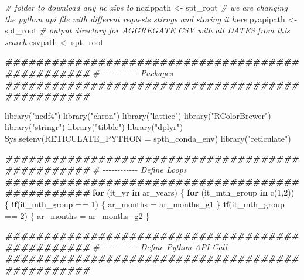 \documentclass[
]{book}
\newenvironment{Shaded}{\begin{snugshade}}{\end{snugshade}}
\newcommand{\AttributeTok}[1]{\textcolor[rgb]{0.77,0.63,0.00}{#1}}
\newcommand{\CommentTok}[1]{\textcolor[rgb]{0.56,0.35,0.01}{\textit{#1}}}
\newcommand{\ControlFlowTok}[1]{\textcolor[rgb]{0.13,0.29,0.53}{\textbf{#1}}}
\newcommand{\DecValTok}[1]{\textcolor[rgb]{0.00,0.00,0.81}{#1}}
\newcommand{\DocumentationTok}[1]{\textcolor[rgb]{0.56,0.35,0.01}{\textbf{\textit{#1}}}}
\newcommand{\FunctionTok}[1]{\textcolor[rgb]{0.00,0.00,0.00}{#1}}
\newcommand{\NormalTok}[1]{#1}
\newcommand{\OtherTok}[1]{\textcolor[rgb]{0.56,0.35,0.01}{#1}}
\newcommand{\SpecialCharTok}[1]{\textcolor[rgb]{0.00,0.00,0.00}{#1}}
\newcommand{\StringTok}[1]{\textcolor[rgb]{0.31,0.60,0.02}{#1}}
\begin{document}
\begin{Shaded}
\begin{Highlighting}[]
\CommentTok{\# folder to download any nc zips to}
\NormalTok{nczippath }\OtherTok{\textless{}{-}}\NormalTok{ spt\_root}
\CommentTok{\# we are changing the python api file with different requests stirngs and storing it here}
\NormalTok{pyapipath }\OtherTok{\textless{}{-}}\NormalTok{ spt\_root}
\CommentTok{\# output directory for AGGREGATE CSV with all DATES from this search}
\NormalTok{csvpath }\OtherTok{\textless{}{-}}\NormalTok{ spt\_root}

\DocumentationTok{\#\#\#\#\#\#\#\#\#\#\#\#\#\#\#\#\#\#\#\#\#\#\#\#\#\#\#\#\#\#\#\#\#\#\#\#\#\#\#\#\#\#\#\#\#\#\#\#\#}
\CommentTok{\# {-}{-}{-}{-}{-}{-}{-}{-}{-}{-}{-}{-} Packages}
\DocumentationTok{\#\#\#\#\#\#\#\#\#\#\#\#\#\#\#\#\#\#\#\#\#\#\#\#\#\#\#\#\#\#\#\#\#\#\#\#\#\#\#\#\#\#\#\#\#\#\#\#\#}

\FunctionTok{library}\NormalTok{(}\StringTok{"ncdf4"}\NormalTok{)}
\FunctionTok{library}\NormalTok{(}\StringTok{"chron"}\NormalTok{)}
\FunctionTok{library}\NormalTok{(}\StringTok{"lattice"}\NormalTok{)}
\FunctionTok{library}\NormalTok{(}\StringTok{"RColorBrewer"}\NormalTok{)}
\FunctionTok{library}\NormalTok{(}\StringTok{"stringr"}\NormalTok{)}
\FunctionTok{library}\NormalTok{(}\StringTok{"tibble"}\NormalTok{)}
\FunctionTok{library}\NormalTok{(}\StringTok{"dplyr"}\NormalTok{)}
\FunctionTok{Sys.setenv}\NormalTok{(}\AttributeTok{RETICULATE\_PYTHON =}\NormalTok{ spth\_conda\_env)}
\FunctionTok{library}\NormalTok{(}\StringTok{"reticulate"}\NormalTok{)}

\DocumentationTok{\#\#\#\#\#\#\#\#\#\#\#\#\#\#\#\#\#\#\#\#\#\#\#\#\#\#\#\#\#\#\#\#\#\#\#\#\#\#\#\#\#\#\#\#\#\#\#\#\#}
\CommentTok{\# {-}{-}{-}{-}{-}{-}{-}{-}{-}{-}{-}{-} Define Loops}
\DocumentationTok{\#\#\#\#\#\#\#\#\#\#\#\#\#\#\#\#\#\#\#\#\#\#\#\#\#\#\#\#\#\#\#\#\#\#\#\#\#\#\#\#\#\#\#\#\#\#\#\#\#}
\ControlFlowTok{for}\NormalTok{ (it\_yr }\ControlFlowTok{in}\NormalTok{ ar\_years) \{}
  \ControlFlowTok{for}\NormalTok{ (it\_mth\_group }\ControlFlowTok{in} \FunctionTok{c}\NormalTok{(}\DecValTok{1}\NormalTok{,}\DecValTok{2}\NormalTok{)) \{}
    \ControlFlowTok{if}\NormalTok{(it\_mth\_group }\SpecialCharTok{==} \DecValTok{1}\NormalTok{) \{}
\NormalTok{      ar\_months }\OtherTok{=}\NormalTok{ ar\_months\_g1}
\NormalTok{    \}}
    \ControlFlowTok{if}\NormalTok{(it\_mth\_group }\SpecialCharTok{==} \DecValTok{2}\NormalTok{) \{}
\NormalTok{      ar\_months }\OtherTok{=}\NormalTok{ ar\_months\_g2}
\NormalTok{    \}}

    \DocumentationTok{\#\#\#\#\#\#\#\#\#\#\#\#\#\#\#\#\#\#\#\#\#\#\#\#\#\#\#\#\#\#\#\#\#\#\#\#\#\#\#\#\#\#\#\#\#\#\#\#\#}
    \CommentTok{\# {-}{-}{-}{-}{-}{-}{-}{-}{-}{-}{-}{-} Define Python API Call}
    \DocumentationTok{\#\#\#\#\#\#\#\#\#\#\#\#\#\#\#\#\#\#\#\#\#\#\#\#\#\#\#\#\#\#\#\#\#\#\#\#\#\#\#\#\#\#\#\#\#\#\#\#\#}


\end{Highlighting}
\end{Shaded}
\end{document}
